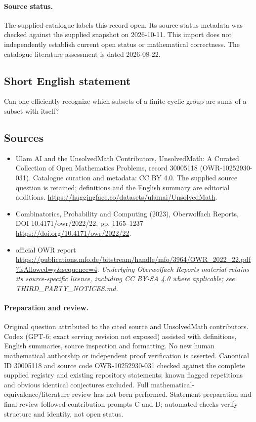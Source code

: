 \documentclass[11pt]{article}
\begin{document}
\paragraph{Source status.}
The supplied catalogue labels this record open. Its source-status metadata was checked against the supplied snapshot on 2026-10-11. This import does not independently establish current open status or mathematical correctness. The catalogue literature assessment is dated 2026-08-22.
\subsection{Short English statement}
Can one efficiently recognize which subsets of a finite cyclic group are sums of a subset with itself?
\subsection{Sources}
\begin{itemize}
\item[S1] Ulam AI and the UnsolvedMath Contributors, UnsolvedMath: A Curated Collection of Open Mathematics Problems, record 30005118 (OWR-10252930-031). Catalogue curation and metadata: CC BY 4.0. The supplied source question is retained; definitions and the English summary are editorial additions.
\url{https://huggingface.co/datasets/ulamai/UnsolvedMath}.
\item[S2] Combinatorics, Probability and Computing (2023), Oberwolfach Reports, DOI 10.4171/owr/2022/22, pp. 1165--1237
\url{https://doi.org/10.4171/owr/2022/22}.
\item[S3] official OWR report
\url{https://publications.mfo.de/bitstream/handle/mfo/3964/OWR_2022_22.pdf?isAllowed=y&sequence=4}.
\textit{Underlying Oberwolfach Reports material retains its source-specific licence, including CC BY-SA 4.0 where applicable; see THIRD\_PARTY\_NOTICES.md.}
\end{itemize}
\paragraph{Preparation and review.}
Original question attributed to the cited source and UnsolvedMath contributors. Codex (GPT-6; exact serving revision not exposed) assisted with definitions, English summaries, source inspection and formatting. No new human mathematical authorship or independent proof verification is asserted. Canonical ID 30005118 and source code OWR-10252930-031 checked against the complete supplied registry and existing repository statements; known flagged repetitions and obvious identical conjectures excluded. Full mathematical-equivalence/literature review has not been performed. Statement preparation and final review followed contribution prompts C and D; automated checks verify structure and identity, not open status.
\label{end:30005118}
\end{document}
